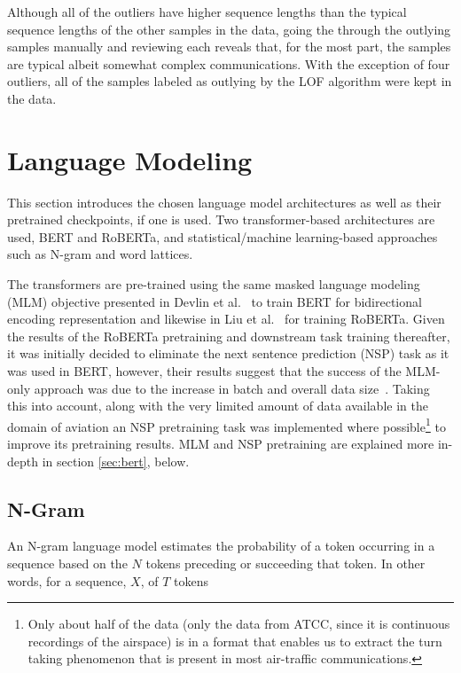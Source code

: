 \documentclass[12pt]{article}
\begin{document}
Although all of the outliers have higher sequence lengths than the typical sequence lengths of the other samples in the data, going the through
the outlying samples manually and reviewing each reveals that, for the most part, the samples are typical albeit somewhat complex communications.
With the exception of four outliers, all of the samples labeled as outlying by the LOF algorithm were kept in the data.

\section{Language Modeling}\label{sec:language_modeling}
This section introduces the chosen language model architectures as well as their pretrained checkpoints, if one is used. Two transformer-based
architectures are used, BERT and RoBERTa, and statistical/machine learning-based approaches such as N-gram and word lattices.

The transformers are pre-trained using the same masked language modeling (MLM) objective presented in Devlin et al.~\cite{devlin_bert_2019} to train
BERT for bidirectional encoding representation and likewise in Liu et al.~\cite{liu_roberta_2019} for training RoBERTa. Given the results of the
RoBERTa pretraining and downstream task training thereafter, it was initially decided to eliminate the next sentence prediction (NSP) task as it was
used in BERT, however, their results suggest that the success of the MLM-only approach was due to the increase in batch and overall data
size~\cite{liu_roberta_2019}. Taking this into account, along with the very limited amount of data available in the domain of aviation an NSP
pretraining task was implemented where possible\footnote{Only about half of the data (only the data from ATCC, since it is continuous recordings of
    the airspace) is in a format that enables us to extract the turn taking phenomenon that is present in most air-traffic communications.} to improve
its pretraining results. MLM and NSP pretraining are explained more in-depth in section \ref{sec:bert}, below.

\subsection{N-Gram}\label{sec:ngram}
An N-gram language model estimates the probability of a token occurring in a sequence based on the \(N\) tokens preceding or succeeding that token.
In other words, for a sequence, $X$, of $T$ tokens
\end{document}
